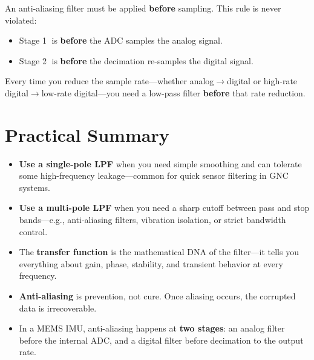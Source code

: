 \documentclass[12pt,a4paper]{article}
\begin{document}
\begin{warningbox}
An anti-aliasing filter must be applied \textbf{before} sampling. This rule is never violated:
\begin{itemize}
    \item Stage \textcircled{1} is \textbf{before} the ADC samples the analog signal.
    \item Stage \textcircled{2} is \textbf{before} the decimation re-samples the digital signal.
\end{itemize}
Every time you reduce the sample rate---whether analog$\to$digital or high-rate digital$\to$low-rate digital---you need a low-pass filter \textbf{before} that rate reduction.
\end{warningbox}

\section{Practical Summary}

\begin{itemize}
    \item \textbf{Use a single-pole LPF} when you need simple smoothing and can tolerate some high-frequency leakage---common for quick sensor filtering in GNC systems.

    \item \textbf{Use a multi-pole LPF} when you need a sharp cutoff between pass and stop bands---e.g., anti-aliasing filters, vibration isolation, or strict bandwidth control.

    \item The \textbf{transfer function} is the mathematical DNA of the filter---it tells you everything about gain, phase, stability, and transient behavior at every frequency.

    \item \textbf{Anti-aliasing} is prevention, not cure. Once aliasing occurs, the corrupted data is irrecoverable.

    \item In a MEMS IMU, anti-aliasing happens at \textbf{two stages}: an analog filter before the internal ADC, and a digital filter before decimation to the output rate.
\end{itemize}
\end{document}
